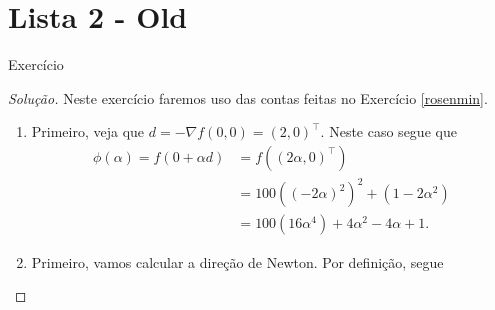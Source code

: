 \documentclass[12pt,twoside,a4paper]{article}
\begin{document}
\section{Lista 2 - Old}
\begin{problema}
Exercício  
\end{problema}
\begin{proof}[Solução]
  Neste exercício faremos uso das contas feitas no
  Exercício \ref{rosenmin}.
  \begin{enumerate}
  \item Primeiro, veja que \(d=-\nabla f(0,0)=(2,0)^\top\). Neste caso
    segue que
    \begin{align}
      \phi(\alpha)=f(0+\alpha d)&=f((2\alpha,0)^\top)\\&=
      100((-2\alpha)^2)^2+(1-2\alpha^2)\\&=
      100(16\alpha^4)+4\alpha^2-4\alpha + 1.
    \end{align}
  \item Primeiro, vamos calcular a direção de Newton. Por definição, segue
    \
  \end{enumerate}
\end{proof}
\end{document}
